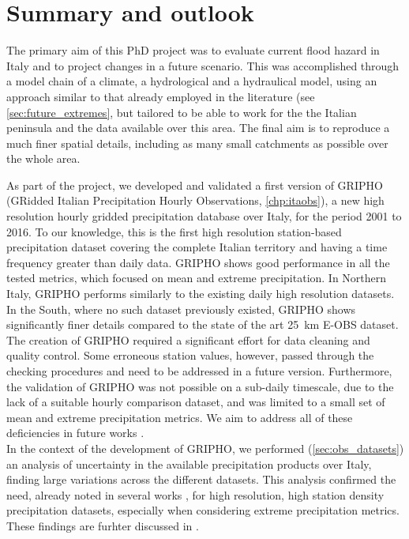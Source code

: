 \chapter{Summary and outlook}\label{chp:conclusions}
The primary aim of this PhD project was to evaluate current flood hazard in Italy and to project changes in a future scenario.
This was accomplished through a model chain of a climate, a hydrological and a hydraulical model, using an approach similar to that already employed in the literature (see \cref{sec:future_extremes}, but tailored to be able to work for the the Italian peninsula  and the data available over this area. The final aim is  to reproduce a much finer spatial details, including as many small catchments as possible over the whole area.

As part of the project, we developed and validated a first version of GRIPHO (GRidded Italian Precipitation Hourly Observations, \cref{chp:itaobs}), a new high resolution hourly gridded precipitation database over Italy, for the period 2001 to 2016.
To our knowledge, this is the first high resolution station-based precipitation dataset covering the complete Italian territory and having a time frequency greater than daily data.
GRIPHO shows good performance in all the tested metrics, which focused on mean and extreme precipitation. In Northern Italy, GRIPHO performs similarly to the existing daily high resolution datasets. In the South, where no such dataset previously existed, GRIPHO shows significantly finer details compared to the state of the art \SI{25}{\kilo\meter} E-OBS dataset.
The creation of GRIPHO required a significant effort for  data cleaning and quality control.
Some erroneous station values, however, passed through the checking procedures and need to be addressed in a future version.
Furthermore, the validation of GRIPHO was not possible on a sub-daily timescale, due to the lack of a suitable hourly comparison dataset, and was limited to a small set of mean and extreme precipitation metrics.
We aim to address all of these deficiencies in future works \citep[][in preparation]{Fantini2018a}.\\
In the context of the development of GRIPHO, we performed (\cref{sec:obs_datasets}) an analysis of uncertainty in the available precipitation products over Italy, finding large variations across the different datasets.
This analysis confirmed the need, already noted in several works \citep{Fantini2016,Prein2016,Prein2017}, for high resolution, high station density precipitation datasets, especially when considering extreme precipitation metrics.
These findings are furhter discussed in \citet[][in preparation]{Fantini2018}.

